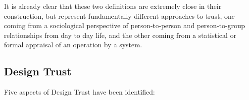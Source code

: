 It is already clear that these two definitions are extremely close in their construction, but represent fundamentally different approaches to trust, one coming from a sociological perspective of person-to-person and person-to-group relationships from day to day life, and the other coming from a statistical or formal appraisal of an operation by a system.



\subsection{Design Trust}\label{sec:design_trust}

Five aspects of Design Trust have been identified: 


